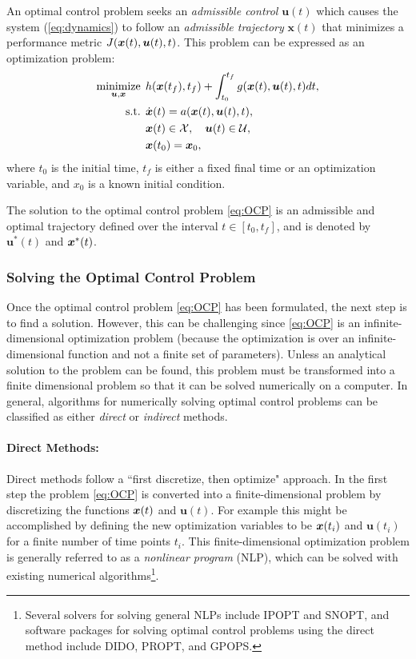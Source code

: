 \begin{definition} 
An optimal control problem seeks an \textit{admissible control} $\bm{u}(t)$ which causes the system (\ref{eq:dynamics}) to follow an \textit{admissible trajectory} $\bm{x}(t)$ that minimizes a performance metric $J(\bm{x}(t),\bm{u}(t),t)$. This problem can be expressed as an optimization problem:
\begin{equation} \label{eq:OCP}
\begin{split}
\underset{\bm{u},\bm{x}}{\text{minimize}} \:\: & h(\bm{x}(t_f),t_f) + \int_{t_0}^{t_f} g(\bm{x}(t),\bm{u}(t),t) dt,\\
\text{s.t.} \:\:& \dot{\bm{x}}(t) = a(\bm{x}(t),\bm{u}(t),t), \\
&\bm{x}(t) \in \mathcal{X}, \quad \bm{u}(t) \in \mathcal{U}, \\
&\bm{x}(t_0) = \bm{x}_0,
\end{split}
\end{equation}
where $t_0$ is the initial time, $t_f$ is either a fixed final time or an optimization variable, and $x_0$ is a known initial condition.
\end{definition} 

The solution to the optimal control problem \eqref{eq:OCP} is an admissible and optimal trajectory defined over the interval $t \in [t_0, t_f]$, and is denoted by $\bm{u}^*(t)$ and $\bm{x}^*(t)$.

\subsubsection{Solving the Optimal Control Problem}
Once the optimal control problem \eqref{eq:OCP} has been formulated, the next step is to find a solution. However, this can be challenging since \eqref{eq:OCP} is an infinite-dimensional optimization problem (because the optimization is over an infinite-dimensional function and not a finite set of parameters). Unless an analytical solution to the problem can be found, this problem must be transformed into a finite dimensional problem so that it can be solved numerically on a computer.
In general, algorithms for numerically solving optimal control problems can be classified as either \textit{direct} or \textit{indirect} methods. 

\paragraph{Direct Methods:}
Direct methods follow a ``first discretize, then optimize" approach. In the first step the problem \eqref{eq:OCP} is converted into a finite-dimensional problem by discretizing the functions $\bm{x}(t)$ and $\bm{u}(t)$. For example this might be accomplished by defining the new optimization variables to be $\bm{x}(t_i)$ and $\bm{u}(t_i)$ for a finite number of time points $t_i$. This finite-dimensional optimization problem is generally referred to as a \textit{nonlinear program} (NLP), which can be solved with existing numerical algorithms\footnote{Several solvers for solving general NLPs include IPOPT and SNOPT, and software packages for solving optimal control problems using the direct method include DIDO, PROPT, and GPOPS.}.

